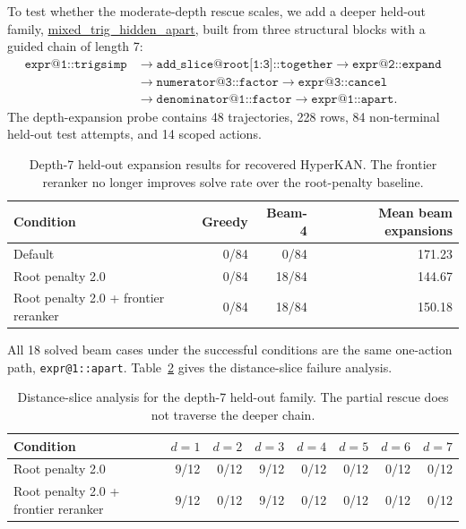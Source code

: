 \documentclass[11pt]{article}
\newcommand{\hyperkan}{HyperKAN}
\begin{document}
To test whether the moderate-depth rescue scales, we add a deeper held-out family, \url{mixed_trig_hidden_apart}, built from three structural blocks with a guided chain of length 7:
\[
\begin{aligned}
\texttt{expr@1::trigsimp}
&\rightarrow \texttt{add\_slice@root[1:3]::together}
\rightarrow \texttt{expr@2::expand}\\
&\rightarrow \texttt{numerator@3::factor}
\rightarrow \texttt{expr@3::cancel}\\
&\rightarrow \texttt{denominator@1::factor}
\rightarrow \texttt{expr@1::apart}.
\end{aligned}
\]
The depth-expansion probe contains 48 trajectories, 228 rows, 84 non-terminal held-out test attempts, and 14 scoped actions.

\begin{table}[t]
\centering
\caption{Depth-7 held-out expansion results for recovered \hyperkan{}. The frontier reranker no longer improves solve rate over the root-penalty baseline.}
\label{tab:depth7}
\begin{tabular}{lrrr}
\toprule
Condition & Greedy & Beam-4 & Mean beam expansions\\
\midrule
Default & 0/84 & 0/84 & 171.23\\
Root penalty 2.0 & 0/84 & 18/84 & 144.67\\
Root penalty 2.0 + frontier reranker & 0/84 & 18/84 & 150.18\\
\bottomrule
\end{tabular}
\end{table}

All 18 solved beam cases under the successful conditions are the same one-action path, \texttt{expr@1::apart}. Table~\ref{tab:distance-slice} gives the distance-slice failure analysis.

\begin{table}[t]
\centering
\caption{Distance-slice analysis for the depth-7 held-out family. The partial rescue does not traverse the deeper chain.}
\label{tab:distance-slice}
\begin{tabular}{lrrrrrrr}
\toprule
Condition & $d=1$ & $d=2$ & $d=3$ & $d=4$ & $d=5$ & $d=6$ & $d=7$\\
\midrule
Root penalty 2.0 & 9/12 & 0/12 & 9/12 & 0/12 & 0/12 & 0/12 & 0/12\\
Root penalty 2.0 + frontier reranker & 9/12 & 0/12 & 9/12 & 0/12 & 0/12 & 0/12 & 0/12\\
\bottomrule
\end{tabular}
\end{table}
\end{document}
